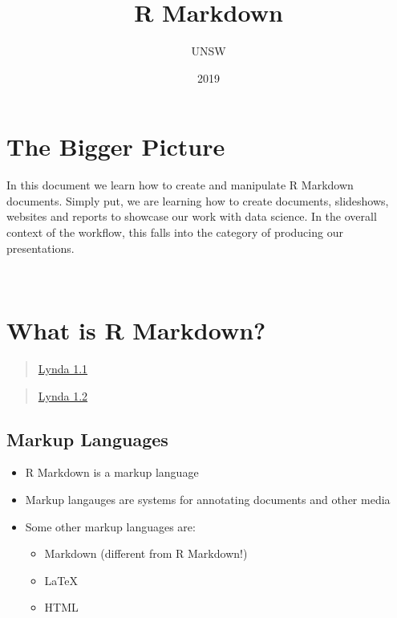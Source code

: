 \documentclass[]{article}
\title{R Markdown}
\author{UNSW}
\date{2019}
\providecommand{\tightlist}{%
  \setlength{\itemsep}{0pt}\setlength{\parskip}{0pt}}
\begin{document}
\maketitle

\hypertarget{the-bigger-picture}{%
\section{The Bigger Picture}\label{the-bigger-picture}}

In this document we learn how to create and manipulate R Markdown
documents. Simply put, we are learning how to create documents,
slideshows, websites and reports to showcase our work with data science.
In the overall context of the workflow, this falls into the category of
producing our presentations.

~

\hypertarget{what-is-r-markdown}{%
\section{What is R Markdown?}\label{what-is-r-markdown}}

\begin{quote}
\href{https://www.lynda.com/RStudio-tutorials/What-Markdown/699348/2700131-4.html?srchtrk=index\%3a1\%0alinktypeid\%3a2\%0aq\%3ar+markdown\%0apage\%3a1\%0as\%3arelevance\%0asa\%3atrue\%0aproducttypeid\%3a2}{Lynda
1.1}
\end{quote}

\begin{quote}
\href{https://www.lynda.com/RStudio-tutorials/What-R-Markdown/699348/2800209-4.html?srchtrk=index\%3a1\%0alinktypeid\%3a2\%0aq\%3ar+markdown\%0apage\%3a1\%0as\%3arelevance\%0asa\%3atrue\%0aproducttypeid\%3a2}{Lynda
1.2}
\end{quote}

\hypertarget{markup-languages}{%
\subsection{Markup Languages}\label{markup-languages}}

\begin{itemize}
\tightlist
\item
  R Markdown is a markup language
\item
  Markup langauges are systems for annotating documents and other media
\item
  Some other markup languages are:

  \begin{itemize}
  \tightlist
  \item
    Markdown (different from R Markdown!)
  \item
    LaTeX
  \item
    HTML
  \end{itemize}
\end{itemize}
\end{document}
